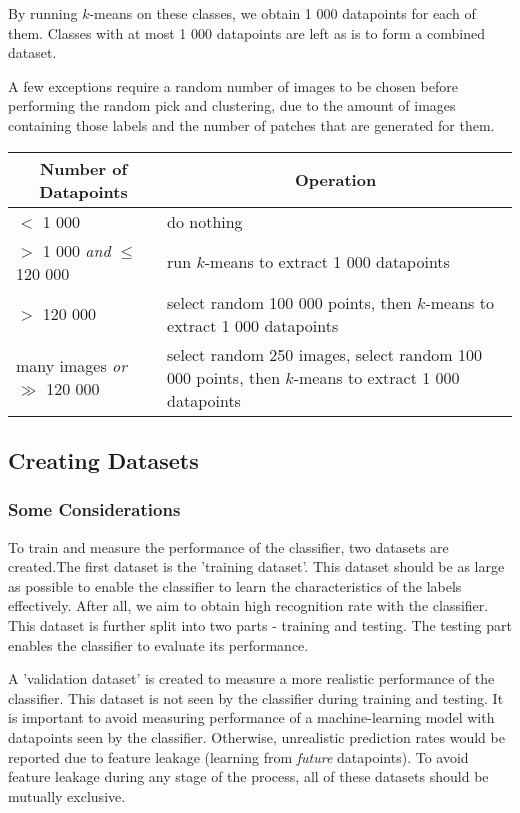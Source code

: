 By running $k$-means on these classes, we obtain 1 000 datapoints for each of them. Classes with at most 1 000 datapoints are left as is to form a combined dataset.

A few exceptions require a random number of images to be chosen before performing the random pick and clustering, due to the amount of images containing those labels and the number of patches that are generated for them.

\parbox{\linewidth} {
	\centering
	\begin{tabularx}{\textwidth}{|l|X|}
    \hline
    \multicolumn{1}{|c|}{\textbf{Number of Datapoints}} & \multicolumn{1}{|c|}{\textbf{Operation}}
    \\ \hline
    $<$ 1 000 & do nothing 
    \\ \hline
    $>$ 1 000 \textit{and} $\leq$ 120 000 & run $k$-means to extract 1 000 datapoints 
    \\ \hline
    $>$ 120 000 & select random 100 000 points, then $k$-means to extract 1 000 datapoints 
    \\ \hline
    many images \textit{or} $\gg$ 120 000 & select random 250 images, select random 100 000 points, then $k$-means to extract 1 000 datapoints 
    \\ \hline
	\end{tabularx}
\label{tab:extract-sum}
}

\subsection{Creating Datasets}
\subsubsection*{Some Considerations}
To train and measure the performance of the classifier, two datasets are created.The first dataset is the 'training dataset'. This dataset should be as large as possible to enable the classifier to learn the characteristics of the labels effectively. After all, we aim to obtain high recognition rate with the classifier. This dataset is further split into two parts - training and testing. The testing part enables the classifier to evaluate its performance.

A 'validation dataset' is created to measure a more realistic performance of the classifier. This dataset is not seen by the classifier during training and testing. It is important to avoid measuring performance of a machine-learning model with datapoints seen by the classifier. Otherwise, unrealistic prediction rates would be reported due to feature leakage (learning from \textit{future} datapoints). To avoid feature leakage during any stage of the process, all of these datasets should be mutually exclusive.

